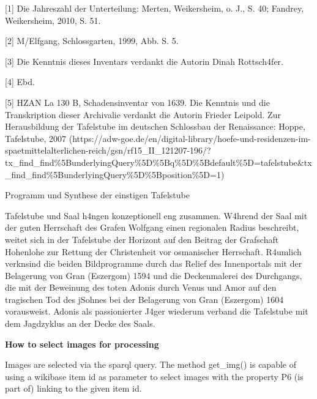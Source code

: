 \documentclass[
  letterpaper,
]{book}
\begin{document}
{[}1{]} Die Jahreszahl der Unterteilung: Merten, Weikersheim, o. J., S.
40; Fandrey, Weikersheim, 2010, S. 51.

{[}2{]} M\xbcnzenmayer/Elfgang, Schlossgarten, 1999, Abb. S. 5.

{[}3{]} Die Kenntnis dieses Inventars verdankt die Autorin Dinah
Rottsch\xa4fer.

{[}4{]} Ebd.

{[}5{]} HZAN La 130 B, Schadensinventar von 1639. Die
Kenntnis und die Transkription dieser Archivalie verdankt die Autorin
Frieder Leipold. Zur Herausbildung der Tafelstube im deutschen
Schlossbau der Renaissance: Hoppe, Tafelstube, 2007
(https://adw-goe.de/en/digital-library/hoefe-und-residenzen-im-spaetmittelalterlichen-reich/gsn/rf15\_II\_121207-196/?tx\_find\_find\%5BunderlyingQuery\%5D\%5Bq\%5D\%5Bdefault\%5D=tafelstube\&tx\_find\_find\%5BunderlyingQuery\%5D\%5Bposition\%5D=1)

Programm und Synthese der einstigen Tafelstube

Tafelstube und Saal h\xa4ngen konzeptionell eng zusammen.
W\xa4hrend der Saal mit der guten Herrschaft des Grafen Wolfgang
einen regionalen Radius beschreibt, weitet sich in der Tafelstube der
Horizont auf den Beitrag der Grafschaft Hohenlohe zur Rettung der
Christenheit vor osmanischer Herrschaft. R\xa4umlich
verkn\xbcpft sind die beiden Bildprogramme durch das Relief des
Innenportals mit der Belagerung von Gran (Eszergom) 1594 und die
Deckenmalerei des Durchgangs, die mit der Beweinung des toten Adonis
durch Venus und Amor auf den tragischen Tod des j\xbcngsten Sohnes
bei der Belagerung von Gran (Eszergom) 1604 vorausweist. Adonis als
passionierter J\xa4ger wiederum verband die Tafelstube mit dem
Jagdzyklus an der Decke des Saals.

\textbf{How to select images for processing}

Images are selected via the sparql query. The method get\_img() is
capable of using a wikibase item id as parameter to select images with
the property P6 (is part of) linking to the given item id.
\end{document}
